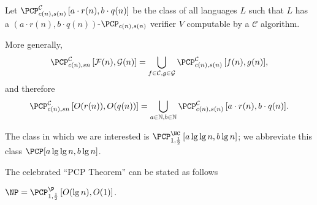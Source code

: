 \documentclass[draft]{article}
\newcommand{\PCPcs}[5]{\PCP^{#1}_{#2, #3}\left[#4, #5\right]}
\newcommand{\lglg}{\lg\lg}
\begin{document}
\begin{definition}
  Let $\PCPcs{\mathcal{C}}{c(n)}{s(n)}{a \cdot r(n)}{b \cdot q(n)}$ be the class of all languages $L$ such that $L$ has a $(a \cdot r(n), b \cdot q(n))$-$\PCP_{c(n), s(n)}$ verifier $V$ computable by a $\mathcal{C}$ algorithm.

  More generally,
  \begin{equation*}
    \PCPcs{\mathcal{C}}{c(n)}{s{n}}{\mathcal{F}(n)}{\mathcal{G}(n)} = \bigcup_{f \in \mathcal{C}, g \in \mathcal{G}}{\PCPcs{\mathcal{C}}{c(n)}{s(n)}{f(n)}{g(n)}},
    \end{equation*}
  and therefore
  \begin{equation*}
    \PCPcs{\mathcal{C}}{c(n)}{s{n}}{O(r(n))}{O(q(n))} = \bigcup_{a \in \mathbb{N}, b \in \mathbb{N}}{\PCPcs{\mathcal{C}}{c(n)}{s(n)}{a \cdot r(n)}{b \cdot q(n)}}.
    \end{equation*}
\end{definition}

The class in which we are interested is $\PCPcs{\NC}{1}{\frac{1}{2}}{a \lglg{n}}{b \lg n}$; we abbreviate this class $\PCP[a \lglg n, b \lg n]$.

The celebrated ``PCP Theorem'' can be stated as follows

\begin{theorem}
  $\NP = \PCPcs{\P}{1}{\frac{1}{2}}{O(\lg n)}{O(1)}$.
\end{theorem}
\end{document}
